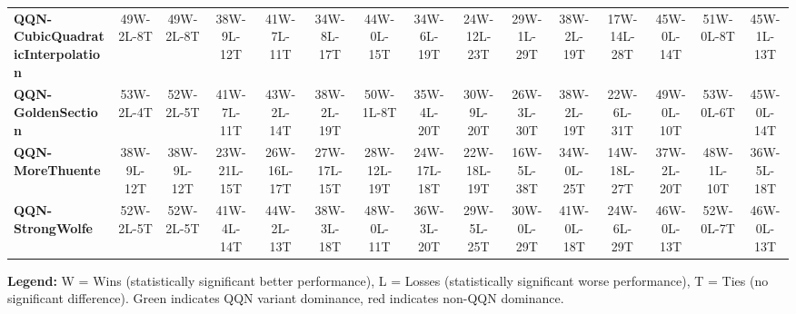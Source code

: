 \documentclass{article}
\begin{document}
\begin{table}[htbp]
{\begin{tabular}{lcccccccccccccc}
\textbf{QQN-CubicQuadraticInterpolation} & \textcolor{green!70!black}{49W-2L-8T} & \textcolor{green!70!black}{49W-2L-8T} & \textcolor{green!70!black}{38W-9L-12T} & \textcolor{green!70!black}{41W-7L-11T} & \textcolor{green!70!black}{34W-8L-17T} & \textcolor{green!70!black}{44W-0L-15T} & \textcolor{green!70!black}{34W-6L-19T} & \textcolor{green!70!black}{24W-12L-23T} & \textcolor{green!70!black}{29W-1L-29T} & \textcolor{green!70!black}{38W-2L-19T} & \textcolor{green!70!black}{17W-14L-28T} & \textcolor{green!70!black}{45W-0L-14T} & \textcolor{green!70!black}{51W-0L-8T} & \textcolor{green!70!black}{45W-1L-13T} \\
\textbf{QQN-GoldenSection} & \textcolor{green!70!black}{53W-2L-4T} & \textcolor{green!70!black}{52W-2L-5T} & \textcolor{green!70!black}{41W-7L-11T} & \textcolor{green!70!black}{43W-2L-14T} & \textcolor{green!70!black}{38W-2L-19T} & \textcolor{green!70!black}{50W-1L-8T} & \textcolor{green!70!black}{35W-4L-20T} & \textcolor{green!70!black}{30W-9L-20T} & \textcolor{green!70!black}{26W-3L-30T} & \textcolor{green!70!black}{38W-2L-19T} & \textcolor{green!70!black}{22W-6L-31T} & \textcolor{green!70!black}{49W-0L-10T} & \textcolor{green!70!black}{53W-0L-6T} & \textcolor{green!70!black}{45W-0L-14T} \\
\textbf{QQN-MoreThuente} & \textcolor{green!70!black}{38W-9L-12T} & \textcolor{green!70!black}{38W-9L-12T} & \textcolor{green!70!black}{23W-21L-15T} & \textcolor{green!70!black}{26W-16L-17T} & \textcolor{green!70!black}{27W-17L-15T} & \textcolor{green!70!black}{28W-12L-19T} & \textcolor{green!70!black}{24W-17L-18T} & \textcolor{green!70!black}{22W-18L-19T} & \textcolor{green!70!black}{16W-5L-38T} & \textcolor{green!70!black}{34W-0L-25T} & \textcolor{red!70!black}{14W-18L-27T} & \textcolor{green!70!black}{37W-2L-20T} & \textcolor{green!70!black}{48W-1L-10T} & \textcolor{green!70!black}{36W-5L-18T} \\
\textbf{QQN-StrongWolfe} & \textcolor{green!70!black}{52W-2L-5T} & \textcolor{green!70!black}{52W-2L-5T} & \textcolor{green!70!black}{41W-4L-14T} & \textcolor{green!70!black}{44W-2L-13T} & \textcolor{green!70!black}{38W-3L-18T} & \textcolor{green!70!black}{48W-0L-11T} & \textcolor{green!70!black}{36W-3L-20T} & \textcolor{green!70!black}{29W-5L-25T} & \textcolor{green!70!black}{30W-0L-29T} & \textcolor{green!70!black}{41W-0L-18T} & \textcolor{green!70!black}{24W-6L-29T} & \textcolor{green!70!black}{46W-0L-13T} & \textcolor{green!70!black}{52W-0L-7T} & \textcolor{green!70!black}{46W-0L-13T} \\
\bottomrule
\end{tabular}
}
\end{table}
\textbf{Legend:} W = Wins (statistically significant better performance), L = Losses (statistically significant worse performance), T = Ties (no significant difference). Green indicates QQN variant dominance, red indicates non-QQN dominance.
\end{document}
